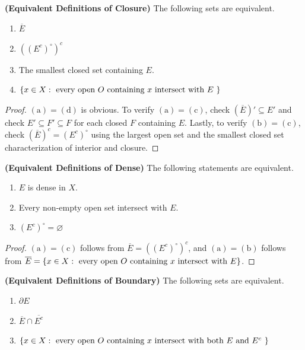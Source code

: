 \documentclass{report}
\begin{document}
\begin{theorem}
\textbf{(Equivalent Definitions of Closure)} The following sets are equivalent.
\begin{enumerate}[label=(\alph*)]
  \item $\overline{E}$
  \item $((E^c)^\circ )^c$ 
  \item The smallest closed set containing $E$.
  \item $\{ x\in X:\text{ every open $O$ containing $x$ intersect with $E$ } \}$
\end{enumerate}
\end{theorem}
\begin{proof}
$(\text{a})=(\text{d})$ is obvious. To verify $(\text{a})=(\text{c})$, check $(\overline{E})' \subseteq E'$ and check $E'\subseteq F'\subseteq F$ for each closed $F$ containing $E$. Lastly, to verify $(\text{b})=(\text{c})$, check $(\overline{E})^c=(E^c)^\circ $ using the largest open set and the smallest closed set characterization of interior and closure.
\end{proof}
\begin{theorem}
\textbf{(Equivalent Definitions of Dense)} The following statements are equivalent. 
\begin{enumerate}[label=(\alph*)]
  \item $E$ is dense in $X$. 
  \item Every non-empty open set intersect with $E$. 
  \item $(E^c)^\circ =\varnothing$
\end{enumerate}
\end{theorem}
\begin{proof}
$(\text{a})=(\text{c})$ follows from $\overline{E}=((E^c)^\circ )^c$, and $(\text{a})=(\text{b})$ follows from $\overline{E}=\{ x\in X:\text{ every open }O\text{ containing }x\text{ intersect with }E \}$.
\end{proof}
\begin{theorem}
\textbf{(Equivalent Definitions of Boundary)} The following sets are equivalent.
\begin{enumerate}[label=(\alph*)]
  \item $\partial E$
  \item $\overline{E}\cap \overline{E^c}$
  \item $\{ x \in X:\text{ every open $O$ containing $x$ intersect with both $E$ and $E^c$ } \}$
\end{enumerate}
\end{theorem}
\end{document}
